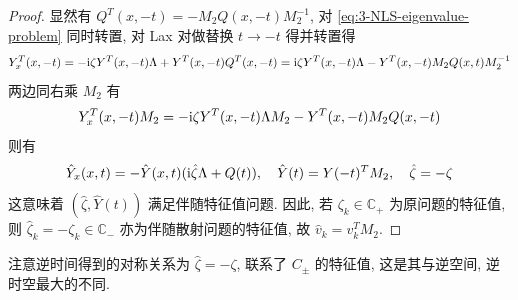 \begin{proof}
    显然有 $ Q^{T}(x,-t) = -M_{2} Q(x,-t) M_{2}^{-1} $, 对 \eqref{eq:3-NLS-eigenvalue-problem} 同时转置, 对 Lax 对做替换 $t \to -t$ 得并转置得
    \begin{equation}
        Y_{x}^{T}(x,-t) = -\mathrm{i} \zeta Y^{T}(x,-t) \Lambda + Y^{T}(x,-t) Q^{T}(x,-t) = \mathrm{i} \zeta Y^{T}(x,-t) \Lambda - Y^{T}(x,-t) M_{2} Q(x,t) M_{2}^{-1}
    \end{equation}
    两边同右乘 $M_{2}$ 有
    \begin{equation}
        Y_{x}^{T}(x,-t) M_{2} = -\mathrm{i} \zeta Y^{T}(x,-t) \Lambda M_{2} - Y^{T}(x,-t) M_{2} Q(x,-t)
    \end{equation}
    则有
    \begin{equation}
        \hat{Y}_{x}(x,t) = -\hat{Y}(x,t)(\mathrm{i} \hat{\zeta}\Lambda + Q(t)), \quad \hat{Y}(t) = Y(-t)^{T}M_{2}, \quad \hat{\zeta} = -\zeta
    \end{equation}
    这意味着 $ (\hat{\zeta}, \hat{Y}(t)) $ 满足伴随特征值问题. 因此, 若 $ \zeta_{k} \in \mathbb{C_{+}} $ 为原问题的特征值, 则 $ \hat{\zeta}_{k} = -\zeta_{k} \in \mathbb{C}_{-} $ 亦为伴随散射问题的特征值, 故 $ \hat{v}_{k} = v_{k}^{T} M_{2} $.
\end{proof}
\begin{remark}
    注意逆时间得到的对称关系为 $\hat{\zeta} = -\zeta$, 联系了 $C_{\pm}$ 的特征值, 这是其与逆空间, 逆时空最大的不同.
\end{remark}

